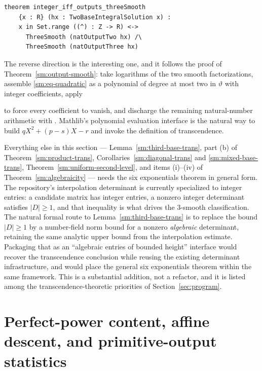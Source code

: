 \documentclass[11pt,oneside]{article}
\theoremstyle{definition}
\theoremstyle{remark}
\newcommand{\thetaq}{\vartheta}
\newcommand{\lean}[1]{\texttt{\detokenize{#1}}}
\begin{document}
\begin{lstlisting}[style=leanstyle,caption={Proposed output-smoothness signature.}]
theorem integer_iff_outputs_threeSmooth
    {x : R} (hx : TwoBaseIntegralSolution x) :
    x in Set.range ((^) : Z -> R) <->
      ThreeSmooth (natOutputTwo hx) /\
      ThreeSmooth (natOutputThree hx)
\end{lstlisting}

The reverse direction is the interesting one, and it follows the proof of
Theorem~\ref{sm:output-smooth}: take logarithms of the two smooth factorizations, assemble
\eqref{sm:eq-quadratic} as a polynomial of degree at most two in $\thetaq$ with integer
coefficients, apply
\begin{center}
\lean{transcendental_logThreeDivLogTwo}
\end{center}
to force every coefficient to vanish, and discharge the remaining natural-number arithmetic
with \lean{omega}.  Mathlib's polynomial evaluation interface is the natural way to build
$qX^2+(p-s)X-r$ and invoke the definition of transcendence.

Everything else in this section --- Lemma~\ref{sm:third-base-trans}, part (b) of
Theorem~\ref{sm:product-trans}, Corollaries~\ref{sm:diagonal-trans} and
\ref{sm:mixed-base-trans}, Theorem~\ref{sm:uniform-second-level}, and items (i)--(iv) of
Theorem~\ref{sm:algebraicity} --- needs the six exponentials theorem in general form.  The
repository's interpolation determinant is currently specialized to integer entries: a
candidate matrix has integer entries, a nonzero integer determinant satisfies $|D|\ge1$, and
that inequality is what drives the $3$-smooth classification.  The natural formal route to
Lemma~\ref{sm:third-base-trans} is to replace the bound $|D|\ge1$ by a number-field norm
bound for a nonzero \emph{algebraic} determinant, retaining the same analytic upper bound
from the interpolation estimate.  Packaging that as an ``algebraic entries of bounded
height'' interface would recover the transcendence conclusion while reusing the existing
determinant infrastructure, and would place the general six exponentials theorem within the
same framework.  This is a substantial addition, not a refactor, and it is listed among the
transcendence-theoretic priorities of Section~\ref{sec:program}.

\section{Perfect-power content, affine descent, and primitive-output statistics}\label{sec:powers}
\end{document}
